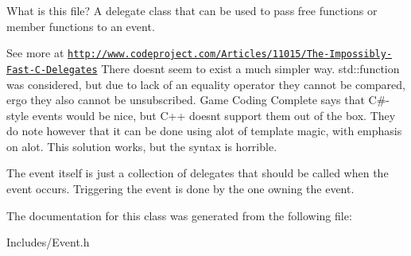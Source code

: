 What is this file? A delegate class that can be used to pass free functions or member functions to an event. 

See more at \href{http://www.codeproject.com/Articles/11015/The-Impossibly-Fast-C-Delegates}{\tt http\+://www.\+codeproject.\+com/\+Articles/11015/\+The-\/\+Impossibly-\/\+Fast-\/\+C-\/\+Delegates} There doesn\textquotesingle{}t seem to exist a much simpler way. std\+::function was considered, but due to lack of an equality operator they cannot be compared, ergo they also cannot be unsubscribed. Game Coding Complete says that C\#-\/style events would be nice, but C++ doesn\textquotesingle{}t support them out of the box. They do note however that it can be done using alot of template magic, with emphasis on alot. This solution works, but the syntax is horrible.

The event itself is just a collection of delegates that should be called when the event occurs. Triggering the event is done by the one owning the event. 

The documentation for this class was generated from the following file\+:\begin{DoxyCompactItemize}
\item 
Includes/Event.\+h\end{DoxyCompactItemize}
